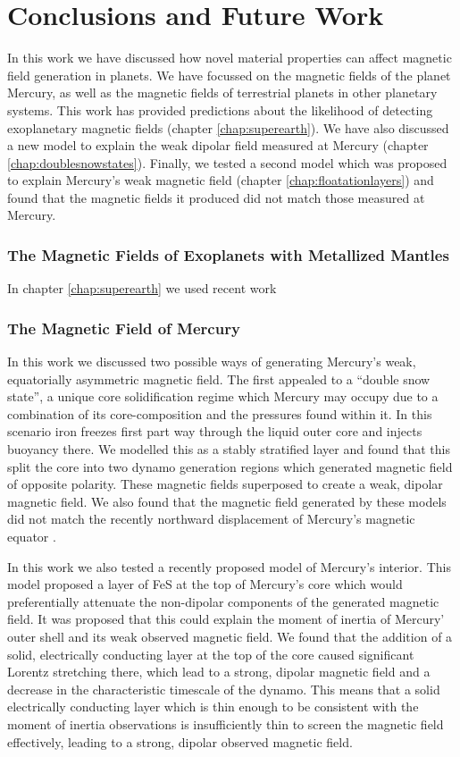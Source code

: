 
\chapter{Conclusions and Future Work}
\label{chap:conclusion}
In this work we have discussed how novel material properties can affect magnetic field generation in planets. We have focussed on the magnetic fields of the planet Mercury, as well as the magnetic fields of terrestrial planets in other planetary systems. This work has provided predictions about the likelihood of detecting exoplanetary magnetic fields (chapter \ref{chap:superearth}). We have also discussed a new model to explain the weak dipolar field measured at Mercury (chapter \ref{chap:doublesnowstates}). Finally, we tested a second model which was proposed \citep{smith2012, hauck2013} to explain Mercury's weak magnetic field (chapter \ref{chap:floatationlayers}) and found that the magnetic fields it produced did not match those measured at Mercury.

\subsection{The Magnetic Fields of Exoplanets with Metallized Mantles}
In chapter \ref{chap:superearth} we used recent work 
\subsection{The Magnetic Field of Mercury}
In this work we discussed two possible ways of generating Mercury's weak, equatorially asymmetric magnetic field. The first appealed to a ``double snow state'', a unique core solidification regime which Mercury may occupy due to a combination of its core-composition and the pressures found within it. In this scenario iron freezes first part way through the liquid outer core and injects buoyancy there. We modelled this as a stably stratified layer and found that this split the core into two dynamo generation regions which generated magnetic field of opposite polarity. These magnetic fields superposed to create a weak, dipolar magnetic field. We also found that the magnetic field generated by these models did not match the recently northward displacement of Mercury's magnetic equator \citep{smith2012}.

In this work we also tested a recently proposed model of Mercury's interior. This model proposed a layer of FeS at the top of Mercury's core which would preferentially attenuate the non-dipolar components of the generated magnetic field. It was proposed that this could explain the moment of inertia of Mercury' outer shell and its weak observed magnetic field. We found that the addition of a solid, electrically conducting layer at the top of the core caused significant Lorentz stretching there, which lead to a strong, dipolar magnetic field and a decrease in the characteristic timescale of the dynamo. This means that a solid electrically conducting layer which is thin enough to be consistent with the moment of inertia observations is insufficiently thin to screen the magnetic field effectively, leading to a strong, dipolar observed magnetic field.


